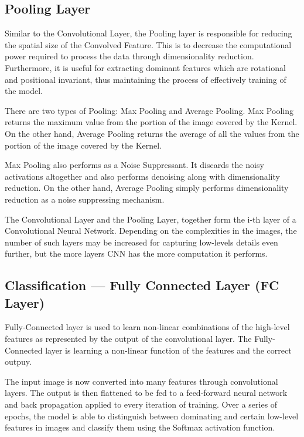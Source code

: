 \subsection{Pooling Layer}

Similar to the Convolutional Layer, the Pooling layer is responsible for reducing the spatial size of the Convolved Feature. This is to decrease the computational power required to process the data through dimensionality reduction. Furthermore, it is useful for extracting dominant features which are rotational and positional invariant, thus maintaining the process of effectively training of the model.

There are two types of Pooling: Max Pooling and Average Pooling. Max Pooling returns the maximum value from the portion of the image covered by the Kernel. On the other hand, Average Pooling returns the average of all the values from the portion of the image covered by the Kernel.

Max Pooling also performs as a Noise Suppressant. It discards the noisy activations altogether and also performs denoising along with dimensionality reduction. On the other hand, Average Pooling simply performs dimensionality reduction as a noise suppressing mechanism. 

The Convolutional Layer and the Pooling Layer, together form the i-th layer of a Convolutional Neural Network. Depending on the complexities in the images, the number of such layers may be increased for capturing low-levels details even further, but the more layers CNN has the more computation it performs.

\subsection{Classification — Fully Connected Layer (FC Layer)}

Fully-Connected layer is used to learn non-linear combinations of the high-level features as represented by the output of the convolutional layer. The Fully-Connected layer is learning a non-linear function of the features and the correct outpuy.

The input image is now converted into many features through convolutional layers. The output is then flattened to be fed to a feed-forward neural network and back propagation applied to every iteration of training. Over a series of epochs, the model is able to distinguish between dominating and certain low-level features in images and classify them using the Softmax activation function.


